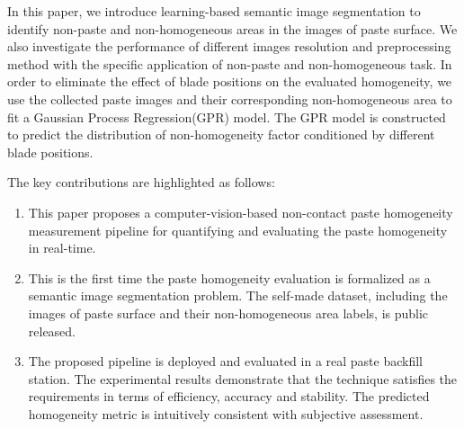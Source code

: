 \documentclass[pdflatex,sn-mathphys]{sn-jnl}%
\theoremstyle{thmstyleone}%
\theoremstyle{thmstyletwo}%
\theoremstyle{thmstylethree}%
\begin{document}
In this paper, we introduce learning-based semantic image segmentation to identify non-paste and non-homogeneous areas in the  images of paste surface.          
We also investigate the performance of different images resolution and preprocessing method with the specific application of non-paste and non-homogeneous task. 
In order to eliminate the effect of blade positions on the evaluated homogeneity, we use the collected paste images and their corresponding non-homogeneous area to fit a Gaussian Process Regression(GPR) model\cite{Gaussian_Tutor}.
The GPR model is constructed to predict the  distribution of non-homogeneity factor conditioned by different blade positions.

The key contributions are highlighted as follows:
\begin{enumerate}
    \item This paper proposes a computer-vision-based non-contact paste homogeneity measurement pipeline for quantifying and evaluating the paste homogeneity in real-time.
    \item This is the first time the paste homogeneity evaluation is formalized as a semantic image segmentation problem. 
    The self-made dataset, including the images of paste surface and their non-homogeneous area labels, is public released. 
    
    \item The proposed pipeline is deployed and evaluated in a real paste backfill station. 
    The experimental results demonstrate that the technique satisfies the requirements in terms of efficiency, accuracy and stability. The predicted homogeneity metric is intuitively consistent with subjective assessment.
\end{enumerate}
\end{document}
